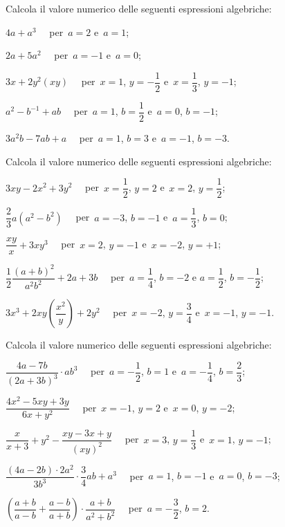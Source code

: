 \begin{esercizio}[\Ast]
\label{ese:9.20} %
Calcola il valore numerico delle seguenti espressioni algebriche:
 \begin{enumeratea}
\spazielenx
 \item $4a+a^{3}\quad$ per~$a=2$ e~$a=1$;
 \item $2a+5a^{2}\quad$ per~$a=-1$ e~$a=0$;
 \item $3x+2y^{2}(xy)\quad$ per~$x=1$, $y=-{\dfrac{1}{2}}$ e~$x=\dfrac{1}{3}$, $y=-1$;
 \item $a^{2}-b^{-1}+ab\quad$ per~$a=1$, $b=\dfrac{1}{2}$ e~$a=0$, $b=-1$;
 \item $3a^{2}b-7ab+a\quad$ per~$a=1$, $b=3$ e~$a=-1$, $b=-3$.
 \end{enumeratea}
\end{esercizio}
\begin{esercizio}[\Ast]
\label{ese:9.21} %
Calcola il valore numerico delle seguenti espressioni algebriche:
 \begin{enumeratea}
\spazielenx
 \item $3xy-2x^{2}+3y^{2}\quad$ per~$x=\dfrac{1}{2}$, $y=2$ e~$x=2$, $y=\dfrac{1}{2}$;
 \item $\dfrac{2}{3}a\left(a^2-b^2 \right) \quad$ per~$a=-3$, $b=-1$ e~$a=\dfrac{1}{3}$, $b=0$;
 \item $\dfrac{xy}{x}+3xy^{3}\quad$ per~$x=2$, $y=-1$ e~$x=-2$, $y=+1$;
 \item $\dfrac{1}{2}\dfrac{(a+b)^{2}}{a^{2}b^{2}}+2a+3b\quad$ per~$a=\dfrac{1}{4}$, $b=-2$ e $a=\dfrac{1}{2}$, $b=-{\dfrac{1}{2}}$;
 \item $3x^{3}+2xy\left(\dfrac{x^{2}}{y}\right)+2y^{2}\quad$ per~$x=-2$, $y=\dfrac{3}{4}$ e~$x=-1$, $y=-1$.
 \end{enumeratea}
\end{esercizio}

\begin{esercizio}[\Ast]
\label{ese:9.22} %
Calcola il valore numerico delle seguenti espressioni algebriche:
 \begin{enumeratea}
\spazielenx
 \item $\dfrac{4a-7b}{(2a+3b)^{3}}\cdot ab^{3}\quad$ per~$a=-{\dfrac{1}{2}}$, $b=1$ e~$a=-{\dfrac{1}{4}}$, $b=\dfrac{2}{3}$;
 \item $\dfrac{4x^{2}-5xy+3y}{6x+y^{2}}\quad$ per~$x=-1$, $y=2$ e~$x=0$, $y=-2$;
 \item $\dfrac{x}{x+3}+y^{2}-\dfrac{xy-3x+y}{(\mathit{xy})^{2}}\quad$ per~$x=3$, $y=\dfrac{1}{3}$ e~$x=1$, $y=-1$;
 \item $\dfrac{(4a-2b)\cdot {2a^{2}}}{3b^{3}}\cdot {\dfrac{3}{4}}ab+a^{3}\quad$ per~$a=1$, $b=-1$ e~$a=0$, $b=-3$;
 \item $\left(\dfrac{a+b}{a-b}+\dfrac{a-b}{a+b}\right)\cdot {\dfrac{a+b}{a^2+b^2}}\quad$ per~$a=-\dfrac{3}{2}$, $b=2$.
 \end{enumeratea}
\end{esercizio}

